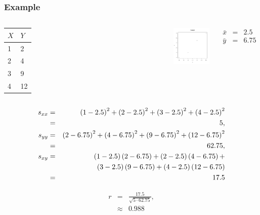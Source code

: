 \begin{frame}
  \frametitle{Example}
  \vspace*{-1em}
  \begin{columns}

    \begin{tabular}{l|l}
      $X$ & $Y$ \\ \hline
      1 & 2 \\
      2 & 4  \\
      3 & 9 \\
      4 & 12
    \end{tabular}


    \vspace*{-1em}
    \includegraphics[width=3cm]{img/simpleCorrelationExample}


    {
      \begin{eqnarray*}
        \bar{x} & = & 2.5 \\
        \bar{y} & = & 6.75
      \end{eqnarray*}
    }

    \vfill

  \end{columns}

  {
    \begin{eqnarray*}
      s_{xx} & = & \left( 1-2.5\right)^2 + \left( 2 - 2.5 \right)^2 + \left( 3 - 2.5 \right)^2 + \left( 4 - 2.5 \right)^2 \\
            & = & 5, \\
      s_{yy} & = & \left( 2-6.75\right)^2 + \left( 4 - 6.75 \right)^2 + \left( 9 - 6.75 \right)^2 + \left( 12 - 6.75 \right)^2 \\
            & = & 62.75, \\
      s_{xy} & = & \left( 1-2.5\right)\left( 2-6.75\right) + \left( 2 - 2.5 \right)\left( 4 - 6.75 \right) + \\
            &   & \left( 3 - 2.5 \right)\left( 9 - 6.75 \right) + \left( 4 - 2.5 \right)\left( 12 - 6.75 \right) \\
            & = & 17.5
    \end{eqnarray*}
  } 

  {
    \vspace*{-2em}
    \begin{eqnarray*}
      r & = & \frac{17.5}{\sqrt{5\cdot 62.75}}, \\
        & \approx & 0.988
    \end{eqnarray*}
  }


\end{frame}



